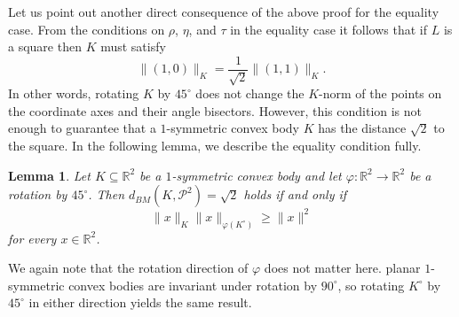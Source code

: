 \documentclass[12pt,a4paper]{article}
\newtheorem{lem}[twr]{Lemma}
\theoremstyle{definition}
\newcommand\R{\mathbb{R}}
\newcommand\CP{\mathcal{P}}
\begin{document}
Let us point out another direct consequence of the above proof for the equality case.  From the conditions on $\rho$, $\eta$, and $\tau$ in the equality case it follows that if $L$ is a square then $K$ must satisfy
$$ \|(1,0)\|_K = \frac{1}{\sqrt{2}} \|(1,1)\|_K. $$
In other words, rotating $K$ by $45^\circ$ does not change the $K$-norm of the points on the coordinate axes and their angle bisectors. However, this condition is not enough to guarantee that a $1$-symmetric convex body $K$ has the distance $\sqrt{2}$ to the square. In the following lemma, we describe the equality condition fully.



\begin{lem}
\label{lem:1symm_equal_cond}
Let $K \subseteq \R^2$ be a $1$-symmetric convex body and let $\varphi \colon \R^2 \to \R^2$ be a rotation by $45^\circ$. Then $d_{BM}(K,\CP^2) = \sqrt{2}$ holds if and only if
\begin{equation}
\label{eq:1symm_equal_cond}
\| x\|_K \| x\|_{\varphi(K^\circ)} \geq \| x \|^2
\end{equation}
for every $x \in \R^2$.
\end{lem}

We again note that the rotation direction of $\varphi$ does not matter here. planar $1$-symmetric convex bodies are invariant under rotation by $90^\circ$, so rotating $K^\circ$ by $45^\circ$ in either direction yields the same result.
\end{document}
